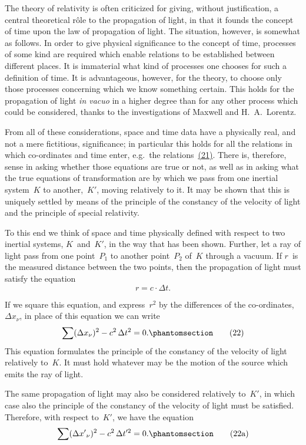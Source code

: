 \documentclass[12pt]{book}[2005/09/16]
\newcommand{\Change}[2]{#2}
\newcommand{\Add}[1]{\Change{}{#1}}
\newcommand{\PageSep}[1]{\ignorespaces}
\newcommand{\Tag}[1]{%
  \phantomsection
  \label{eqn:#1}
  \tag*{#1}
}
\newcommand{\Eqref}[1]{\hyperref[eqn:#1]{#1}}
\begin{document}
The theory of relativity is often criticized for giving,
%
%
without justification, a central theoretical rôle to the
propagation of light, in that it founds the concept of time
upon the law of propagation of light. The situation,
however, is somewhat as follows. In order to give
physical significance to the concept of time, processes of
some kind are required which enable relations to be
established between different places. It is immaterial
what kind of processes one chooses for such a definition
of time. It is advantageous, however, for the theory,
to choose only those processes concerning which we know
something certain. This holds for the propagation of
light \textit{in vacuo} in a higher degree than for any other process
which could be considered, thanks to the investigations
of Maxwell and H.~A.~Lorentz.

From all of these considerations, space and time data
have a physically real, and not a mere fictitious, significance;
in particular this holds for all the relations in
which co-ordinates and time enter, e.g.~the relations~\Eqref{(21)}.
There is, therefore, sense in asking whether those
equations are true or not, as well as in asking what the
true equations of transformation are by which we pass
from one inertial system~$K$ to another,~$K'$, moving
relatively to it. It may be shown that this is uniquely
\PageSep{32}
settled by means of the principle of the constancy of the
velocity of light and the principle of special relativity.

To this end we think of space and time physically
defined with respect to two inertial systems, $K$~and~$K'$, in
the way that has been shown. Further, let a ray of light
pass from one point~$P_{1}$ to another point~$P_{2}$ of~$K$ through
a vacuum. If $r$~is the measured distance between the two
points, then the propagation of light must satisfy the
equation
\[
r = c·\Delta t.
\]

If we square this equation, and express~$r^{2}$ by the
differences of the co-ordinates,~$\Delta x_{\nu}$, in place of this equation
we can write
\[
\sum (\Delta x_{\nu})^{2} - c^{2}\, \Delta t^{2} = 0\Add{.}
\Tag{(22)}
\]
This equation formulates the principle of the constancy
of the velocity of light relatively to~$K$. It must hold
whatever may be the motion of the source which emits
the ray of light.

The same propagation of light may also be considered
relatively to~$K'$, in which case also the principle of the
constancy of the velocity of light must be satisfied.
Therefore, with respect to~$K'$, we have the equation
\[
\sum ({\Delta x'}_{\nu})^{2} - c^{2}\, \Delta t'^{2} = 0\Add{.}
\Tag{(22a)}
\]
\end{document}
